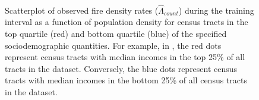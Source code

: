 \documentclass{svjour3}
\begin{document}
\begin{figure}[!htb]
\begin{center}
{          }\\
          
      \end{center}
      \caption{Scatterplot of observed fire density rates ($\hat\Lambda_{count}$) during the training interval as a function of population density for census tracts in the top quartile (red) and bottom quartile (blue) of the specified sociodemographic quantities. For example, in \protect{}, the red dots represent census tracts with median incomes in the top 25\% of all tracts in the dataset. Conversely, the blue dots represent census tracts with median incomes in the bottom 25\% of all census tracts in the dataset.}
     \label{fig:sociodemographic}
  \end{figure}
 
\end{document}
